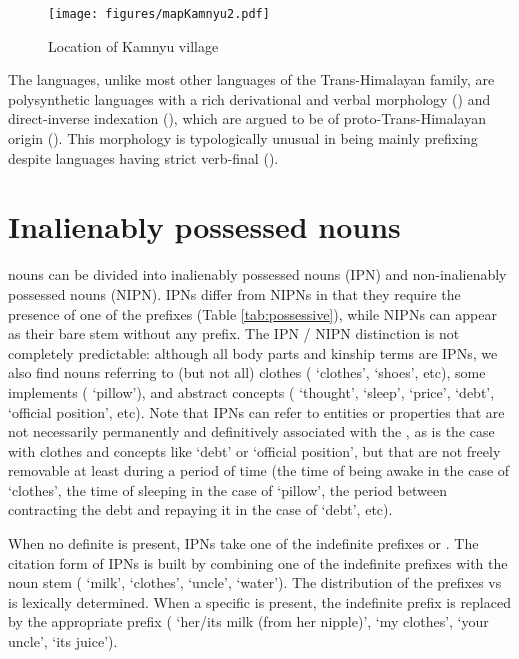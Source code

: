\documentclass[output=paper]{langsci/langscibook}
\begin{document}
\begin{figure}
\caption{Location of Kamnyu village}
\label{fig:kamnyu}
\texttt{[image: figures/mapKamnyu2.pdf]}
\end{figure}

The  languages, unlike most other languages of the Trans-Himalayan family, are polysynthetic languages with a rich derivational and  verbal morphology (\citealt{jacques12incorp, jackson14morpho}) and direct-inverse indexation (\citealt{delancey81direction, jackson02rentongdengdi, jacques10inverse, gongxun14agreement}), which are argued to be of proto-Trans-Himalayan origin (\citealt{delancey10agreement, jacques12agreement}). This morphology is typologically unusual in being mainly prefixing despite  languages having strict verb-final  (\citealt{jacques13harmonization}).

 \section{Inalienably possessed nouns} 
 nouns can be divided into inalienably possessed nouns (IPN) and non-inalienably possessed nouns (NIPN). IPNs differ from NIPNs in that they require the presence of one of the  prefixes (Table \ref{tab:possessive}), while NIPNs can appear as their bare stem without any  prefix. The IPN / NIPN distinction is not completely predictable: although all body parts and kinship terms are IPNs, we also find nouns referring to (but not all) clothes ( `clothes',  `shoes', etc), some implements ( `pillow'), and abstract concepts ( `thought',  `sleep',  `price',  `debt',  `official position', etc). Note that IPNs can refer to entities or properties that are not necessarily permanently and definitively associated with the , as is the case with clothes and concepts like `debt' or `official position', but that are not freely removable at least during a period of time (the time of being awake in the case of `clothes', the time of sleeping in the case of `pillow', the period between contracting the debt and repaying it in the case of `debt', etc).

When no definite  is present, IPNs take one of the indefinite  prefixes  or . The citation form of IPNs is built by combining one of the indefinite prefixes with the noun stem ( `milk',  `clothes',  `uncle',  `water'). The distribution of the prefixes  vs  is lexically determined.  When a specific  is present, the indefinite prefix is replaced by the appropriate  prefix ( `her/its milk (from her nipple)',  `my clothes',  `your uncle',  `its juice'). 
\end{document}
